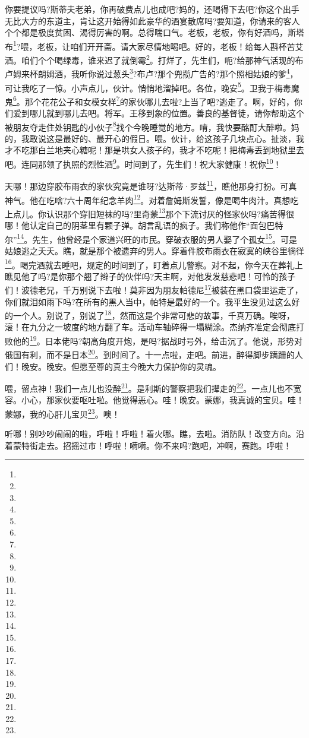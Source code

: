 \par 你要提议吗?斯蒂夫老弟，你再破费点儿也成吧?妈的，还喝得下去吧?你这个出手无比大方的东道主，肯让这开始得如此豪华的酒宴散席吗?要知道，你请来的客人个个都是极度贫困、渴得厉害的啊。总得喘口气。老板，老板，你有好酒吗，斯塔布\footnote{}?喂，老板，让咱们开开斋。请大家尽情地喝吧。好的，老板！给每人斟杯苦艾酒。咱们个个喝绿毒，谁来迟了就倒霉\footnote{}。打烊了，先生们，呃?给那神气活现的布卢姆来杯朗姆酒，我听你说过葱头\footnote{}?布卢?那个兜揽广告的?那个照相姑娘的爹\footnote{}，可让我吃了一惊。小声点儿，伙计。悄悄地溜掉吧。各位，晚安\footnote{}。卫我于梅毒魔鬼\footnote{}。那个花花公子和女模女样\footnote{}的家伙哪儿去啦?上当了吧?逃走了。啊，好的，你们爱到哪儿就到哪儿去吧。将军。王移到象的位置。善良的基督徒，请你帮助这个被朋友夺走住处钥匙的小伙子\footnote{}找个今晚睡觉的地方。唷，我快要酩酊大醉啦。妈的，我敢说这是最好的、最开心的假日。喂。伙计，给这孩子几块点心。扯淡，我才不吃那白兰地夹心糖呢！那是哄女人孩子的，我才不吃呢！把梅毒丢到地狱里去吧。连同那领了执照的烈性酒\footnote{}。时间到了，先生们！祝大家健康！祝你\footnote{}！
\par 天哪！那边穿胶布雨衣的家伙究竟是谁呀?达斯蒂·罗兹\footnote{}，瞧他那身打扮。可真神气。他在吃啥?六十周年纪念羊肉\footnote{}。对着詹姆斯发誓，像是喝牛肉汁。真想吃上点儿。你认识那个穿旧短袜的吗?里奇蒙\footnote{}那个下流讨厌的怪家伙吗?痛苦得很哪！他认定自己的阴茎里有颗子弹。胡言乱语的疯子。我们称他作“面包巴特尔”\footnote{}。先生，他曾经是个家道兴旺的市民。穿破衣服的男人娶了个孤女\footnote{}。可是姑娘逃之夭夭。瞧，就是那个被遗弃的男人。穿着件胶布雨衣在寂寞的峡谷里徜徉\footnote{}。喝完酒就去睡吧，规定的时间到了，盯着点儿警察。对不起，你今天在葬礼上瞧见他了吗?是你那个翘了辫子的伙伴吗?天主啊，对他发发慈悲吧！可怜的孩子们！波德老兄，千万别说下去啦！莫非因为朋友帕德尼\footnote{}被装在黑口袋里运走了，你们就泪如雨下吗?在所有的黑人当中，帕特是最好的一个。我平生没见过这么好的一个人。别说了，别说了\footnote{}，然而这是个非常可悲的故事，千真万确。唉呀，滚！在九分之一坡度的地方翻了车。活动车轴碎得一塌糊涂。杰纳齐准定会彻底打败他的\footnote{}。日本佬吗?朝高角度开炮，是吗?据战时号外，给击沉了。他说，形势对俄国有利，而不是日本\footnote{}。到时间了。十一点啦，走吧。前进，醉得脚步蹒跚的人们！晚安。晚安。但愿至尊的真主今晚大力保护你的灵魂。
\par 喂，留点神！我们一点儿也没醉\footnote{}。是利斯的警察把我们撵走的\footnote{}。一点儿也不宽容。小心，那家伙要呕吐啦。他觉得恶心。哇！晚安。蒙娜，我真诚的宝贝。哇！蒙娜，我的心肝儿宝贝\footnote{}。噢！
\par 听哪！别吵吵闹闹的啦，呼啦！呼啦！着火哪。瞧，去啦。消防队！改变方向。沿着蒙特街走去。招摇过市！呼啦！嗬嗬。你不来吗?跑吧，冲啊，赛跑。呼啦！
